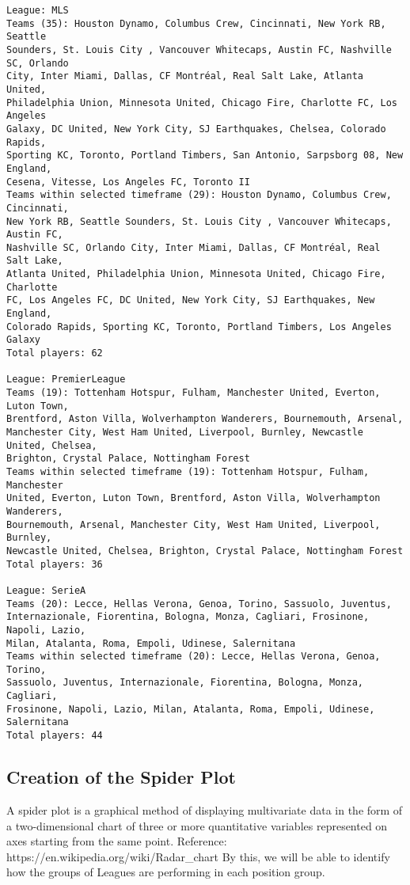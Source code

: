 \documentclass[11pt]{article}
\begin{document}
\begin{Verbatim}[commandchars=\\\{\}]
League: MLS
Teams (35): Houston Dynamo, Columbus Crew, Cincinnati, New York RB, Seattle
Sounders, St. Louis City , Vancouver Whitecaps, Austin FC, Nashville SC, Orlando
City, Inter Miami, Dallas, CF Montréal, Real Salt Lake, Atlanta United,
Philadelphia Union, Minnesota United, Chicago Fire, Charlotte FC, Los Angeles
Galaxy, DC United, New York City, SJ Earthquakes, Chelsea, Colorado Rapids,
Sporting KC, Toronto, Portland Timbers, San Antonio, Sarpsborg 08, New England,
Cesena, Vitesse, Los Angeles FC, Toronto II
Teams within selected timeframe (29): Houston Dynamo, Columbus Crew, Cincinnati,
New York RB, Seattle Sounders, St. Louis City , Vancouver Whitecaps, Austin FC,
Nashville SC, Orlando City, Inter Miami, Dallas, CF Montréal, Real Salt Lake,
Atlanta United, Philadelphia Union, Minnesota United, Chicago Fire, Charlotte
FC, Los Angeles FC, DC United, New York City, SJ Earthquakes, New England,
Colorado Rapids, Sporting KC, Toronto, Portland Timbers, Los Angeles Galaxy
Total players: 62

League: PremierLeague
Teams (19): Tottenham Hotspur, Fulham, Manchester United, Everton, Luton Town,
Brentford, Aston Villa, Wolverhampton Wanderers, Bournemouth, Arsenal,
Manchester City, West Ham United, Liverpool, Burnley, Newcastle United, Chelsea,
Brighton, Crystal Palace, Nottingham Forest
Teams within selected timeframe (19): Tottenham Hotspur, Fulham, Manchester
United, Everton, Luton Town, Brentford, Aston Villa, Wolverhampton Wanderers,
Bournemouth, Arsenal, Manchester City, West Ham United, Liverpool, Burnley,
Newcastle United, Chelsea, Brighton, Crystal Palace, Nottingham Forest
Total players: 36

League: SerieA
Teams (20): Lecce, Hellas Verona, Genoa, Torino, Sassuolo, Juventus,
Internazionale, Fiorentina, Bologna, Monza, Cagliari, Frosinone, Napoli, Lazio,
Milan, Atalanta, Roma, Empoli, Udinese, Salernitana
Teams within selected timeframe (20): Lecce, Hellas Verona, Genoa, Torino,
Sassuolo, Juventus, Internazionale, Fiorentina, Bologna, Monza, Cagliari,
Frosinone, Napoli, Lazio, Milan, Atalanta, Roma, Empoli, Udinese, Salernitana
Total players: 44

    \end{Verbatim}

    \subsection{Creation of the Spider
Plot}\label{creation-of-the-spider-plot}

    A spider plot is a graphical method of displaying multivariate data in
the form of a two-dimensional chart of three or more quantitative
variables represented on axes starting from the same point. Reference:
https://en.wikipedia.org/wiki/Radar\_chart By this, we will be able to
identify how the groups of Leagues are performing in each position
group.
\end{document}

